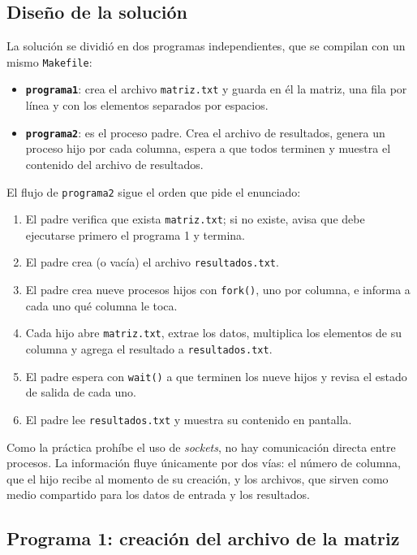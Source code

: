 \subsection{Diseño de la solución}
\label{sec:prac02:diseno}

La solución se dividió en dos programas independientes, que se compilan con un mismo \texttt{Makefile}:

\begin{itemize}[leftmargin=*]
    \item \textbf{\texttt{programa1}}: crea el archivo \texttt{matriz.txt} y guarda en él la matriz, una fila por línea y con los elementos separados por espacios.
    \item \textbf{\texttt{programa2}}: es el proceso padre. Crea el archivo de resultados, genera un proceso hijo por cada columna, espera a que todos terminen y muestra el contenido del archivo de resultados.
\end{itemize}

El flujo de \texttt{programa2} sigue el orden que pide el enunciado:

\begin{enumerate}[leftmargin=*]
    \item El padre verifica que exista \texttt{matriz.txt}; si no existe, avisa que debe ejecutarse primero el programa 1 y termina.
    \item El padre crea (o vacía) el archivo \texttt{resultados.txt}.
    \item El padre crea nueve procesos hijos con \texttt{fork()}, uno por columna, e informa a cada uno qué columna le toca.
    \item Cada hijo abre \texttt{matriz.txt}, extrae los datos, multiplica los elementos de su columna y agrega el resultado a \texttt{resultados.txt}.
    \item El padre espera con \texttt{wait()} a que terminen los nueve hijos y revisa el estado de salida de cada uno.
    \item El padre lee \texttt{resultados.txt} y muestra su contenido en pantalla.
\end{enumerate}

Como la práctica prohíbe el uso de \emph{sockets}, no hay comunicación directa entre procesos. La información fluye únicamente por dos vías: el número de columna, que el hijo recibe al momento de su creación, y los archivos, que sirven como medio compartido para los datos de entrada y los resultados.

\subsection{Programa 1: creación del archivo de la matriz}
\label{sec:prac02:programa1}

